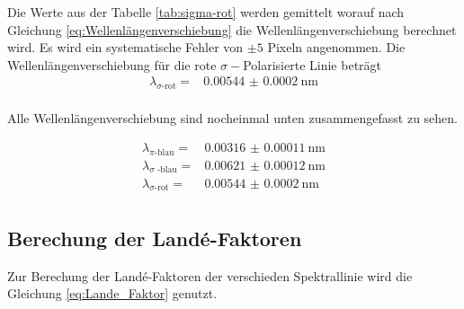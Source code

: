 Die Werte aus der Tabelle \autoref{tab:sigma-rot} werden gemittelt worauf nach Gleichung \eqref{eq:Wellenlängenverschiebung} die Wellenlängenverschiebung berechnet wird.
Es wird ein systematische Fehler von $\pm 5$ Pixeln angenommen.
Die Wellenlängenverschiebung für die rote $\sigma -$Polarisierte Linie beträgt
\begin{align*}
    \lambda _\text{$\sigma$-rot} =&  \SI{0.00544(020)}{\nano\meter} \\
\end{align*}

Alle Wellenlängenverschiebung sind nocheinmal unten zusammengefasst zu sehen.

\begin{align*}
    \lambda _\text{$\pi$-blau} = & \SI{0.00316(011)}{\nano\meter} \\
    \lambda _\text{$\sigma$ -blau} =& \SI{0.00621(012)}{\nano\meter} \\
    \lambda _\text{$\sigma$-rot} =&  \SI{0.00544(020)}{\nano\meter} \\
    \label{tab:Wellenlängenverschiebung_alle}
\end{align*}

\subsection{Berechung der Landé-Faktoren}

Zur Berechung der Landé-Faktoren der verschieden Spektrallinie wird die Gleichung \eqref{eq:Lande_Faktor} genutzt.
